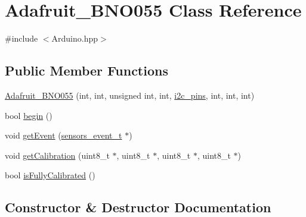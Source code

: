 \hypertarget{classAdafruit__BNO055}{}\section{Adafruit\+\_\+\+B\+N\+O055 Class Reference}
\label{classAdafruit__BNO055}


{\ttfamily \#include $<$Arduino.\+hpp$>$}

\subsection*{Public Member Functions}
\begin{DoxyCompactItemize}
\item 
\hyperlink{classAdafruit__BNO055_a7810dd122407b9411ccccf92f3df2ceb}{Adafruit\+\_\+\+B\+N\+O055} (int, int, unsigned int, int, \hyperlink{Arduino_8hpp_aaa5bce2cb83fc43fec67214bf4feea69}{i2c\+\_\+pins}, int, int, int)
\item 
bool \hyperlink{classAdafruit__BNO055_ac124f2497d533c75f0238b7eb4b4acea}{begin} ()
\item 
void \hyperlink{classAdafruit__BNO055_ad7eacdb709d64fed500ff9fcc962464c}{get\+Event} (\hyperlink{structsensors__event__t}{sensors\+\_\+event\+\_\+t} $\ast$)
\item 
void \hyperlink{classAdafruit__BNO055_a0fa60044350cd979c1dc449682019ddc}{get\+Calibration} (uint8\+\_\+t $\ast$, uint8\+\_\+t $\ast$, uint8\+\_\+t $\ast$, uint8\+\_\+t $\ast$)
\item 
bool \hyperlink{classAdafruit__BNO055_aa28b877a895ee462626f08924e508d25}{is\+Fully\+Calibrated} ()
\end{DoxyCompactItemize}


\subsection{Constructor \& Destructor Documentation}
